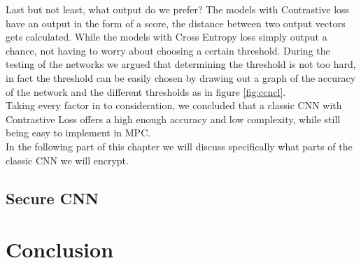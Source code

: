 Last but not least, what output do we prefer? The models with Contrastive loss have an output in the form of a score, the distance between two output vectors gets calculated. While the models with Cross Entropy loss simply output a chance, not having to worry about choosing a certain threshold. During the testing of the networks we argued that determining the threshold is not too hard, in fact the threshold can be easily chosen by drawing out a graph of the accuracy of the network and the different thresholds as in figure \ref{fig:ccncl}.\\

Taking every factor in to consideration, we concluded that a classic CNN with Contrastive Loss offers a high enough accuracy and low complexity, while still being easy to implement in MPC.\\

In the following part of this chapter we will discuss specifically what parts of the classic CNN we will encrypt.

\subsection{Secure CNN}
\label{SecureCNN}


\section{Conclusion}
